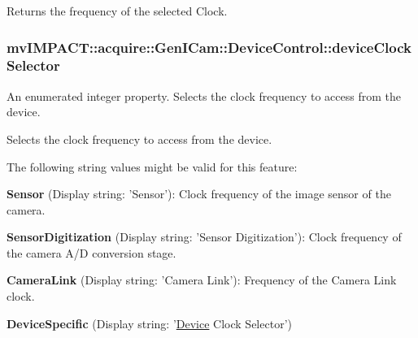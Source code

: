 Returns the frequency of the selected Clock. \hypertarget{classmv_i_m_p_a_c_t_1_1acquire_1_1_gen_i_cam_1_1_device_control_a6dad6390da7a4e7914a3381b7139efb0}{
\subsubsection[{device\+Clock\+Selector}]{ mv\+I\+M\+P\+A\+C\+T\+::acquire\+::\+Gen\+I\+Cam\+::\+Device\+Control\+::device\+Clock\+Selector}}\label{classmv_i_m_p_a_c_t_1_1acquire_1_1_gen_i_cam_1_1_device_control_a6dad6390da7a4e7914a3381b7139efb0}


An enumerated integer property. Selects the clock frequency to access from the device. 

Selects the clock frequency to access from the device.

The following string values might be valid for this feature\+:
\begin{DoxyItemize}
\item {\bfseries Sensor} (Display string\+: 'Sensor')\+: Clock frequency of the image sensor of the camera.
\item {\bfseries Sensor\+Digitization} (Display string\+: 'Sensor Digitization')\+: Clock frequency of the camera A/\+D conversion stage.
\item {\bfseries Camera\+Link} (Display string\+: 'Camera Link')\+: Frequency of the Camera Link clock.
\item {\bfseries Device\+Specific} (Display string\+: '\hyperlink{classmv_i_m_p_a_c_t_1_1acquire_1_1_device}{Device} Clock Selector')
\end{DoxyItemize}

